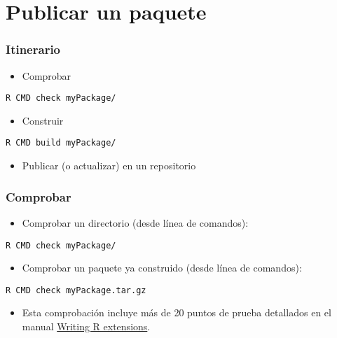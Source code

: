 \documentclass[xcolor={usenames,svgnames,dvipsnames}]{beamer}
\begin{document}
\section{Publicar un paquete}
\label{sec-3}
\begin{frame}[fragile]
\frametitle{Itinerario}
\label{sec-3-1}

\begin{itemize}
\item Comprobar
\end{itemize}

\begin{verbatim}
R CMD check myPackage/
\end{verbatim}
\begin{itemize}
\item Construir
\end{itemize}

\begin{verbatim}
R CMD build myPackage/
\end{verbatim}
\begin{itemize}
\item Publicar (o actualizar) en un repositorio
\end{itemize}
\end{frame}
\begin{frame}[fragile]
\frametitle{Comprobar}
\label{sec-3-2}

\begin{itemize}
\item Comprobar un directorio (desde línea de comandos):
\end{itemize}

\begin{verbatim}
R CMD check myPackage/
\end{verbatim}
\begin{itemize}
\item Comprobar un paquete ya construido (desde línea de comandos):
\end{itemize}

\begin{verbatim}
R CMD check myPackage.tar.gz
\end{verbatim}
\begin{itemize}
\item Esta comprobación incluye más de 20 puntos de prueba detallados
  en el manual \href{http://cran.r-project.org/doc/manuals/R-exts.html#Checking-packages}{Writing R extensions}.
\end{itemize}
\end{frame}
\end{document}
